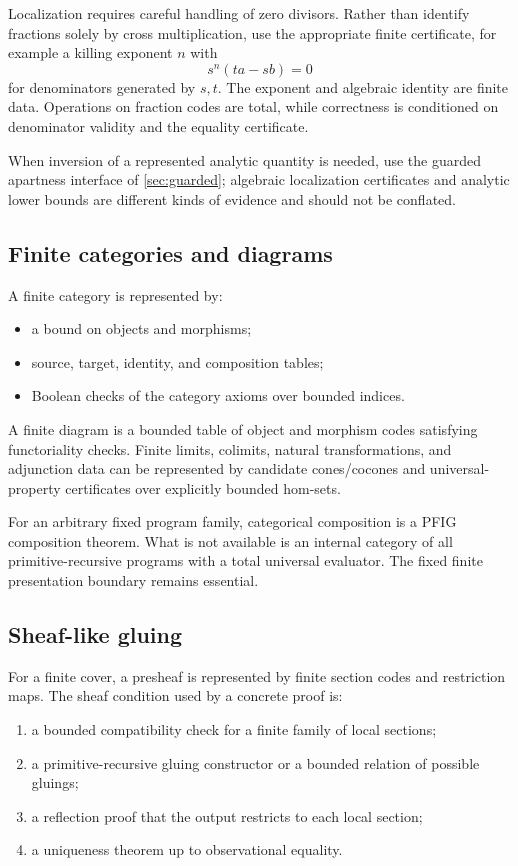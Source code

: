 Localization requires careful handling of zero divisors.  Rather than identify fractions solely by cross multiplication, use the appropriate finite certificate, for example a killing exponent \(n\) with
\[
 s^n(t a-s b)=0
\]
for denominators generated by \(s,t\).  The exponent and algebraic identity are finite data.  Operations on fraction codes are total, while correctness is conditioned on denominator validity and the equality certificate.

When inversion of a represented analytic quantity is needed, use the guarded apartness interface of \cref{sec:guarded}; algebraic localization certificates and analytic lower bounds are different kinds of evidence and should not be conflated.

\subsection{Finite categories and diagrams}

A finite category is represented by:

\begin{itemize}
\item a bound on objects and morphisms;
\item source, target, identity, and composition tables;
\item Boolean checks of the category axioms over bounded indices.
\end{itemize}

A finite diagram is a bounded table of object and morphism codes satisfying functoriality checks.  Finite limits, colimits, natural transformations, and adjunction data can be represented by candidate cones/cocones and universal-property certificates over explicitly bounded hom-sets.

For an arbitrary fixed program family, categorical composition is a PFIG composition theorem.  What is not available is an internal category of all primitive-recursive programs with a total universal evaluator.  The fixed finite presentation boundary remains essential.

\subsection{Sheaf-like gluing}

For a finite cover, a presheaf is represented by finite section codes and restriction maps.  The sheaf condition used by a concrete proof is:

\begin{enumerate}
\item a bounded compatibility check for a finite family of local sections;
\item a primitive-recursive gluing constructor or a bounded relation of possible gluings;
\item a reflection proof that the output restricts to each local section;
\item a uniqueness theorem up to observational equality.
\end{enumerate}

